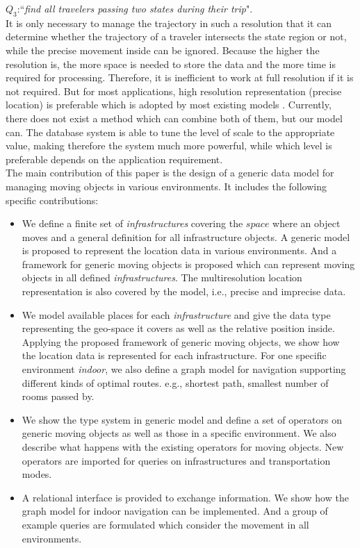 $Q_3$:``\textit{find all travelers passing two states during their trip}". \\

It is only necessary to manage the trajectory in
such a resolution that it can determine whether the trajectory of a traveler intersects the 
state region or not, while the precise movement inside can be ignored.  
Because the higher the resolution is, the more space is needed to store the data and 
the more time is required for processing. Therefore, 
it is inefficient to work at full resolution if it is not required. But for most applications,
high resolution representation (precise location) is preferable which is adopted by most 
existing models \cite{PO+97,GBE+00,GA2006}. Currently, there does not exist a method which can 
combine both of them, but our model can. The database system is able to tune the 
level of scale to the appropriate value, making therefore the system much more powerful, 
while which level is preferable depends on the application requirement. \\


The main contribution of this paper is the design of a generic data model for managing 
moving objects in various environments. It includes the following specific contributions: 
\begin{itemize}
 \item We define a finite set of \textit{infrastructures} covering the $space$ where an object moves 
and a general definition for all infrastructure objects. A generic model is proposed to represent the location data in various environments. And a framework for generic moving objects is proposed which can represent moving objects in all defined \textit{infrastructures}. The multiresolution location representation is also covered by the model, i.e., precise and imprecise data.

 \item We model available places for each \textit{infrastructure} and give the data 
type representing the geo-space it covers as well as the relative position inside. Applying the 
proposed framework of generic moving objects, we show how the location data is represented for each  infrastructure. For one specific environment \textit{indoor}, we also define a graph model for navigation supporting different kinds of optimal routes. e.g., shortest path, smallest number of rooms passed by. 

 \item We show the type system in generic model and define a set of operators on generic moving objects as well as those in a specific environment. We also describe what happens with the
existing operators for moving objects. New operators are imported for queries on infrastructures and transportation modes. 

 \item A relational interface is provided to exchange information. We show how the graph model for indoor navigation can be implemented. And a group of example queries are formulated which consider the movement in all environments. 
\end{itemize}

